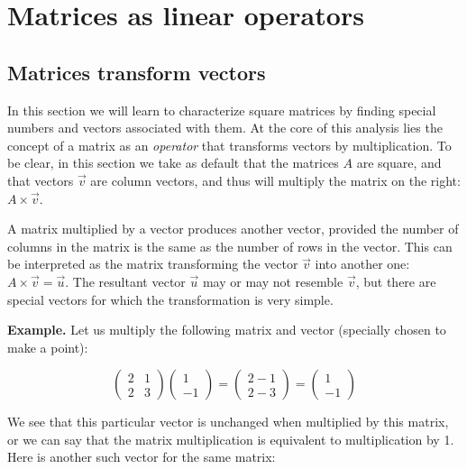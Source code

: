 \documentclass[
  letterpaper,
  DIV=11,
  numbers=noendperiod]{scrreprt}
\begin{document}
\section{Matrices as linear
operators}\label{matrices-as-linear-operators}

\subsection{Matrices transform
vectors}\label{matrices-transform-vectors}

In this section we will learn to characterize square matrices by finding
special numbers and vectors associated with them. At the core of this
analysis lies the concept of a matrix as an \emph{operator} that
transforms vectors by multiplication. To be clear, in this section we
take as default that the matrices \(A\) are square, and that vectors
\(\vec v\) are column vectors, and thus will multiply the matrix on the
right: \(A \times \vec v\).

A matrix multiplied by a vector produces another vector, provided the
number of columns in the matrix is the same as the number of rows in the
vector. This can be interpreted as the matrix transforming the vector
\(\vec v\) into another one: \(A \times \vec v = \vec u\). The resultant
vector \(\vec u\) may or may not resemble \(\vec v\), but there are
special vectors for which the transformation is very simple.

\textbf{Example.} Let us multiply the following matrix and vector
(specially chosen to make a point):

\[
\left(\begin{array}{cc}2 & 1 \\ 2& 3\end{array}\right)\left(\begin{array}{c}1 \\ -1 \end{array}\right) = \left(\begin{array}{c}2 -1 \\ 2 - 3 \end{array}\right) =  \left(\begin{array}{c} 1 \\ -1 \end{array}\right)
\]

We see that this particular vector is unchanged when multiplied by this
matrix, or we can say that the matrix multiplication is equivalent to
multiplication by 1. Here is another such vector for the same matrix:
\end{document}
